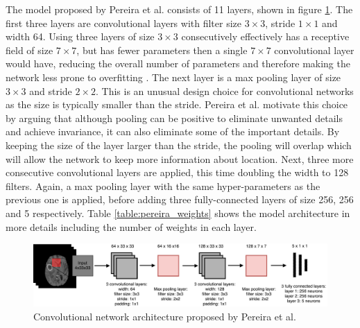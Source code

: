 \documentclass[12pt,a4paper,twoside,openright]{report}
\begin{document}
The model proposed by Pereira et al. \cite{pereira} consists of 11 layers, shown in figure \ref{fig:pereira_model}. The first three layers are convolutional layers with filter size $3 \times 3$, stride $1 \times 1$ and width 64. Using three layers of size $3 \times 3$ consecutively effectively has a receptive field of size $7 \times 7$, but has fewer parameters then a single $7 \times 7$ convolutional layer would have, reducing the overall number of parameters and therefore making the network less prone to overfitting \cite{very_deep_conv_nets}. The next layer is a max pooling layer of size $3 \times 3$ and stride $2 \times 2$. This is an unusual design choice for convolutional networks as the size is typically smaller than the stride. Pereira et al. motivate this choice by arguing that although pooling can be positive to eliminate unwanted details and achieve invariance, it can also eliminate some of the important details. By keeping the size of the layer larger than the stride, the pooling will overlap which will allow the network to keep more information about location. Next, three more consecutive convolutional layers are applied, this time doubling the width to 128 filters. Again, a max pooling layer with the same hyper-parameters as the previous one is applied, before adding three fully-connected layers of size 256, 256 and 5 respectively. Table \ref{table:pereira_weights} shows the model architecture in more details including the number of weights in each layer. 

\begin{figure}
	\centering
	\includegraphics[width=\textwidth]{pereira_model}
	\caption{Convolutional network architecture proposed by Pereira et al.}
	\label{fig:pereira_model}
\end{figure}
\end{document}
